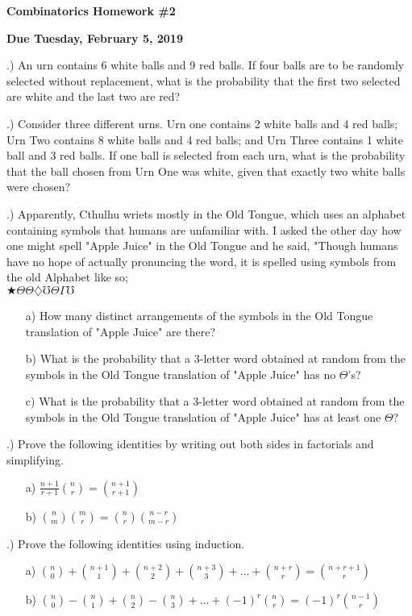 \documentclass[12pt]{article}
\begin{document}
	
	\textbf{\large Combinatorics Homework \#2}	

	\textbf{Due Tuesday, February 5, 2019}

	\medskip
	.) An urn contains 6 white balls and 9 red balls. If four balls are to be randomly selected without replacement, what is the probability that the first two selected are white and the last two are red?

	\medskip
	.) Consider three different urns. Urn one contains 2 white balls and 4 red balls; Urn Two contains 8 white balls and 4 red balls; and Urn Three contains 1 white ball and 3 red balls. If one ball is selected from each urn, what is the probability that the ball chosen from Urn One was white, given that exactly two white balls were chosen?	

	\medskip
	.) Apparently, Cthulhu wriets mostly in the Old Tongue, which uses an alphabet containing symbols that humans are unfamiliar with. I asked the other day how one might spell "Apple Juice" in the Old Tongue and he said, "Though humans have no hope of actually pronuncing the word, it is spelled using symbols from the old Alphabet like so;\\
	$\bigstar\Theta\Theta\diamondsuit\mho\Theta\Gamma\mho$
	\begin{enumerate}
		\item[a)] How many distinct arrangements of the symbols in the Old Tongue translation of "Apple Juice" are there?
		\item[b)] What is the probability that a 3-letter word obtained at random from the symbols in the Old Tongue translation of "Apple Juice" has no $\Theta$'s?
		\item[c)] What is the probability that a 3-letter word obtained at random from the symbols in the Old Tongue translation of "Apple Juice" has at least one $\Theta$?
	\end{enumerate}

	\medskip
	.) Prove the following identities by writing out both sides in factorials and simplifying.
	\begin{enumerate}
		\item[a)] $\displaystyle \frac{n+1}{r+1}{n \choose r}={n+1 \choose r+1}$
		\item[b)] $\displaystyle {n \choose m}{m \choose r}={n \choose r}{n-r \choose m-r}$
	\end{enumerate}
	
	\medskip
	.) Prove the following identities using induction.
	\begin{enumerate}
		\item[a)] $\displaystyle {n \choose 0}+{n+1 \choose 1}+{n+2 \choose 2}+{n+3 \choose 3}+...+{n+r \choose r}={n+r+1 \choose r}$
		\item[b)] $\displaystyle {n \choose 0}-{n \choose 1}+{n \choose 2}-{n \choose 3}+...+{(-1)}^{r}{n \choose r}={(-1)}^{r}{n-1 \choose r}$
	\end{enumerate}
\end{document}
